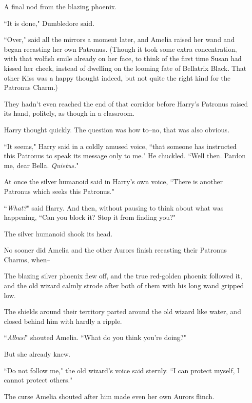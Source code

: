 A final nod from the blazing phoenix.

``It is done," Dumbledore said.

``Over," said all the mirrors a moment later, and Amelia raised her wand and began recasting her own Patronus. (Though it took some extra concentration, with that wolfish smile already on her face, to think of the first time Susan had kissed her cheek, instead of dwelling on the looming fate of Bellatrix Black. That other Kiss was a happy thought indeed, but not quite the right kind for the Patronus Charm.)

\later

They hadn't even reached the end of that corridor before Harry's Patronus raised its hand, politely, as though in a classroom.

Harry thought quickly. The question was how to\---no, that was also obvious.

``It seems," Harry said in a coldly amused voice, ``that someone has instructed this Patronus to speak its message only to me." He chuckled. ``Well then. Pardon me, dear Bella. \emph{Quietus.}"

At once the silver humanoid said in Harry's own voice, ``There is another Patronus which seeks this Patronus."

``\emph{What?}" said Harry. And then, without pausing to think about what was happening, ``Can you block it? Stop it from finding you?"

The silver humanoid shook its head.

\later

No sooner did Amelia and the other Aurors finish recasting their Patronus Charms, when\---

The blazing silver phoenix flew off, and the true red-golden phoenix followed it, and the old wizard calmly strode after both of them with his long wand gripped low.

The shields around their territory parted around the old wizard like water, and closed behind him with hardly a ripple.

``\emph{Albus!}" shouted Amelia. ``What do you think you're doing?"

But she already knew.

``Do not follow me," the old wizard's voice said sternly. ``I can protect myself, I cannot protect others."

The curse Amelia shouted after him made even her own Aurors flinch.

\later

